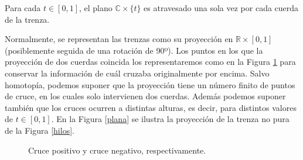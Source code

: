 \documentclass[bibtex, anon]{TEMat-article}
\newcommand{\R}{\mathbb{R}}
\newcommand{\CC}{\mathbb{C}}
\begin{document}
\begin{observacion}
	Para cada $t\in[0,1]$, el plano $\CC\times\{t\}$ es atravesado una sola vez por cada cuerda de la trenza. 
\end{observacion}

Normalmente, se representan las trenzas como su proyección en $\R\times[0,1]$ (posiblemente seguida de una rotación de 90º). Los puntos en los que la proyección de dos cuerdas coincida los representaremos como en la Figura \ref{cruce} para conservar la información de cuál cruzaba originalmente por encima. Salvo homotopía, podemos suponer que la proyección tiene un número finito de puntos de cruce, en los cuales solo intervienen dos cuerdas. Además podemos suponer también que los cruces ocurren a distintas alturas, es decir, para distintos valores de $t\in[0,1]$. En la Figura \ref{plana} se ilustra la proyección de la trenza no pura de la Figura \ref{hilos}. 
\begin{figure}[h!]
	\centering
	
	\caption{Cruce positivo y cruce negativo, respectivamente.}\label{cruce}
	\end{figure}
\end{document}
